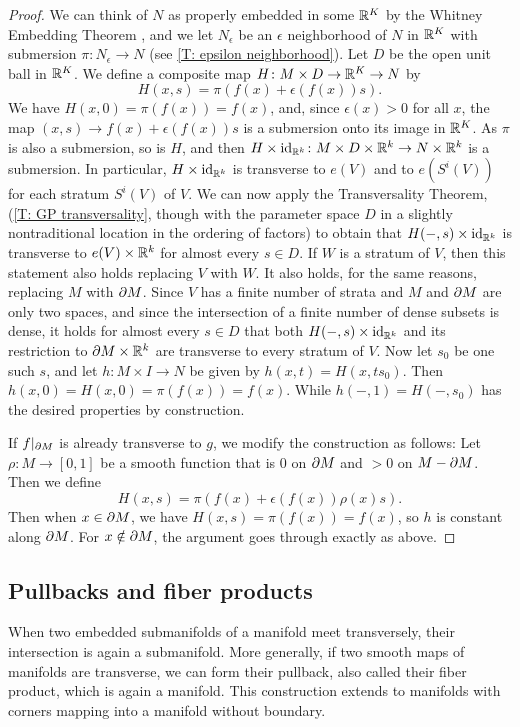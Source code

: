 \begin{proof}
	We can think of $N$ as properly embedded in some $\mathbb{R}^K$ by the Whitney Embedding Theorem \cite[Section 1.8]{GuPo74}, and we let $N_\epsilon$ be an $\epsilon$ neighborhood of $N$ in $\mathbb{R}^K$ with submersion $\pi \colon N_\epsilon \to N$ (see \cref{T: epsilon neighborhood}).
	Let $D$ be the open unit ball in $\mathbb{R}^K$.
	We define a composite map $H \colon M \times D \to \mathbb{R}^K \to N$ by
	$$H(x,s) = \pi(f(x)+ \epsilon(f(x))s).$$
	We have $H(x,0) = \pi(f(x)) = f(x)$, and, since $\epsilon(x)>0$ for all $x$, the map $(x,s) \to f(x)+ \epsilon(f(x))s$ is a submersion onto its image in $\mathbb{R}^K$.
	As $\pi$ is also a submersion, so is $H$, and then $H \times \mathrm{id}_{\mathbb{R}^k} \colon M \times D \times \mathbb{R}^k \to N \times \mathbb{R}^k$ is a submersion.
	In particular, $H \times \mathrm{id}_{\mathbb{R}^k}$ is transverse to $e(V)$ and to $e(S^i(V))$ for each stratum $S^i(V)$ of $V$.
	We can now apply the Transversality Theorem, (\cref{T: GP transversality}, though with the parameter space $D$ in a slightly nontraditional location in the ordering of factors) to obtain that $H(-,s) \times \mathrm{id}_{\mathbb{R}^k}$ is transverse to $e(V) \times \mathbb{R}^k$ for almost every $s \in D$.
	If $W$ is a stratum of $V$, then this statement also holds replacing $V$ with $W$.
	It also holds, for the same reasons, replacing $M$ with $\partial M$.
	Since $V$ has a finite number of strata and $M$ and $\partial M$ are only two spaces, and since the intersection of a finite number of dense subsets is dense, it holds for almost every $s \in D$ that both $H(-,s) \times \mathrm{id}_{\mathbb{R}^k}$ and its restriction to $\partial M \times \mathbb{R}^k$ are transverse to every stratum of $V$.
	Now let $s_0$ be one such $s$, and let $h \colon M \times I \to N$ be given by $h(x,t) = H(x,ts_0)$.
	Then $h(x,0) = H(x,0) = \pi(f(x)) = f(x)$.
	While $h(-,1) = H(-,s_0)$ has the desired properties by construction.

	If $f|_{\partial M}$ is already transverse to $g$, we modify the construction as follows: Let $\rho \colon M \to [0,1]$ be a smooth function that is $0$ on $\partial M$ and $>0$ on $M-\partial M$.
	Then we define
	$$H(x,s) = \pi(f(x)+ \epsilon(f(x))\rho(x)s).$$
	Then when $x \in \partial M$, we have $H(x,s) = \pi(f(x)) = f(x)$, so $h$ is constant along $\partial M$.
	For $x \notin \partial M$, the argument goes through exactly as above.
\end{proof}

\subsection{Pullbacks and fiber products}

When two embedded submanifolds of a manifold meet transversely, their intersection is again a submanifold.
More generally, if two smooth maps of manifolds are transverse, we can form their pullback, also called their fiber product, which is again a manifold.
This construction extends to manifolds with corners mapping into a manifold without boundary.

